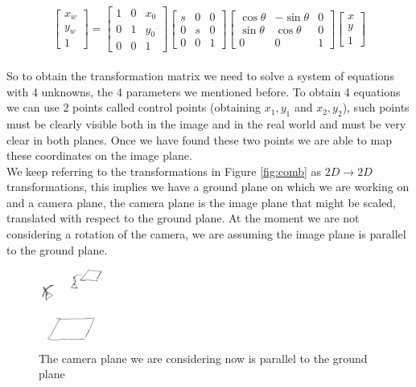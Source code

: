 \[
    \begin{bmatrix}
    x_w \\
    y_w \\
    1
    \end{bmatrix}
    =
    \begin{bmatrix}
    1 & 0 & x_0 \\
    0 & 1 & y_0 \\
    0 & 0 & 1
    \end{bmatrix}
    \begin{bmatrix}
        s & 0 & 0 \\
        0 & s & 0 \\
        0 & 0 & 1
    \end{bmatrix}
    \begin{bmatrix}
    \cos\theta & -\sin\theta & 0 \\
    \sin\theta & \cos\theta & 0 \\
    0 & 0 & 1
    \end{bmatrix}
    \begin{bmatrix}
        x \\
        y \\
        1
    \end{bmatrix}
\]
\\
So to obtain the transformation matrix we need to solve a system of equations with 4 unknowns, the 4 parameters we mentioned before. To obtain 4 equations we can use 2 points called control points (obtaining \(x_1, y_1\) and \(x_2, y_2\)), such points must be clearly visible both in the image and in the real world and must be very clear in both planes. Once we have found these two points we are able to map these coordinates on the image plane.
\\
We keep referring to the transformations in Figure \ref{fig:comb} as \(2D \rightarrow 2D \) transformations, this implies we have a ground plane on which we are working on and a camera plane, the camera plane is the image plane that might be scaled, translated with respect to the ground plane. At the moment we are not considering a rotation of the camera, we are assuming the image plane is parallel to the ground plane.

\begin{figure}[H]
    \centering
    \includegraphics[width=0.2\textwidth]{Figures/planes.png}
    \caption{The camera plane we are considering now is parallel to the ground plane}
    \label{fig:planes}
\end{figure}

